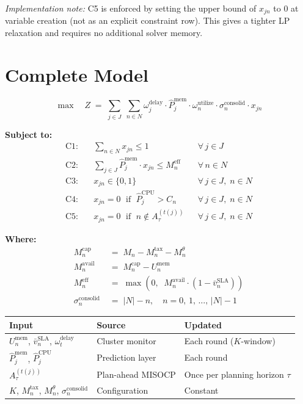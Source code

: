 \documentclass[11pt]{article}
\newcommand{\vbarsla}{\bar{v}_n^{\text{SLA}}}
\newcommand{\Meff}{M_n^{\text{eff}}}
\newcommand{\Mcap}{M_n^{\text{cap}}}
\newcommand{\Mavail}{M_n^{\text{avail}}}
\newcommand{\Mtax}{M_n^{\text{tax}}}
\newcommand{\Mtheta}{M_n^{\theta}}
\newcommand{\sigconsolid}{\sigma_n^{\text{consolid}}}
\newcommand{\omutilize}{\omega_n^{\text{utilize}}}
\newcommand{\Umem}{U_n^{\text{mem}}}
\newcommand{\omdelay}{\omega_j^{\text{delay}}}
\newcommand{\omdelayt}{\omega_t^{\text{delay}}}
\newcommand{\Pmem}{\hat{P}_j^{\text{mem}}}
\newcommand{\Pcpu}{\hat{P}_j^{\text{CPU}}}
\begin{document}
\textit{Implementation note:} C5 is enforced by setting the upper bound of
$x_{jn}$ to 0 at variable creation (not as an explicit constraint row).
This gives a tighter LP relaxation and requires no additional solver memory.

\section{Complete Model}

\[
  \max \quad Z \;=\;
  \sum_{j \in J}\; \sum_{n \in N}
    \omdelay \cdot \Pmem \cdot \omutilize \cdot \sigconsolid \cdot x_{jn}
\]

\noindent\textbf{Subject to:}
\begin{align*}
  \text{C1:}&\quad \sum_{n \in N} x_{jn} \leq 1
    && \forall\, j \in J \\[4pt]
  \text{C2:}&\quad \sum_{j \in J} \Pmem \cdot x_{jn} \leq \Meff
    && \forall\, n \in N \\[4pt]
  \text{C3:}&\quad x_{jn} \in \{0,1\}
    && \forall\, j \in J,\; n \in N \\[4pt]
  \text{C4:}&\quad x_{jn} = 0 \;\text{ if }\; \Pcpu > C_n
    && \forall\, j \in J,\; n \in N \\[4pt]
  \text{C5:}&\quad x_{jn} = 0 \;\text{ if }\; n \notin A_{\tau}^{(t(j))}
    && \forall\, j \in J,\; n \in N
\end{align*}

\noindent\textbf{Where:}
\begin{align*}
  \Mcap    &\;=\; M_n - \Mtax - \Mtheta \\[4pt]
  \Mavail  &\;=\; \Mcap - \Umem \\[4pt]
  \Meff    &\;=\; \max\!\left(0,\;\; \Mavail \cdot (1 - \vbarsla)\right) \\[4pt]
  \sigconsolid &\;=\; |N| - n, \quad n = 0,\,1,\,\ldots,\,|N|-1
\end{align*}

\medskip
\begin{center}
\small
\begin{tabular}{@{}l l l@{}}
\toprule
Input & Source & Updated \\
\midrule
$\Umem$,\; $\vbarsla$,\; $\omdelayt$ & Cluster monitor & Each round ($K$-window) \\
$\Pmem$,\; $\Pcpu$                  & Prediction layer & Each round \\
$A_{\tau}^{(t(j))}$                 & Plan-ahead MISOCP & Once per planning horizon $\tau$ \\
$K$,\; $\Mtax$,\; $\Mtheta$,\; $\sigconsolid$ & Configuration & Constant \\
\bottomrule
\end{tabular}
\end{center}
\end{document}
